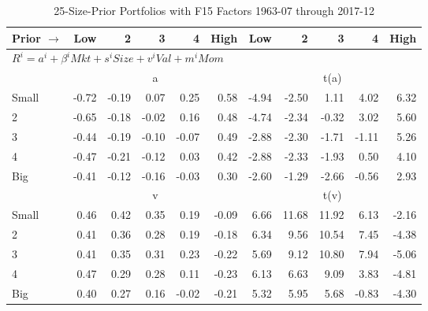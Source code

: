 
\begin{table}[!ht]
\footnotesize
\centering
\caption{25-Size-Prior Portfolios with F15 Factors 1963-07 through 2017-12}
\begin{tabular}{lrrrrrrrrrr}
  \toprule
    Prior $\rightarrow$ & Low & 2 & 3 & 4 & High & Low & 2 & 3 & 4 & High \\ 
  \midrule
  \multicolumn{11}{l}{$R^i=a^i+\beta^iMkt+s^iSize+v^iVal+m^iMom$} \\

  
    
      & \multicolumn{5}{c}{a} & \multicolumn{5}{c}{t(a)}
    
    \\
      \cmidrule(r){2-6} \cmidrule(r){7-11}

    Small   & -0.72  & -0.19  & 0.07  & 0.25  & 0.58  & -4.94  & -2.50  & 1.11  & 4.02  & 6.32  \\
         2  & -0.65  & -0.18  & -0.02  & 0.16  & 0.48  & -4.74  & -2.34  & -0.32  & 3.02  & 5.60  \\
         3  & -0.44  & -0.19  & -0.10  & -0.07  & 0.49  & -2.88  & -2.30  & -1.71  & -1.11  & 5.26  \\
         4  & -0.47  & -0.21  & -0.12  & 0.03  & 0.42  & -2.88  & -2.33  & -1.93  & 0.50  & 4.10  \\
    Big     & -0.41  & -0.12  & -0.16  & -0.03  & 0.30  & -2.60  & -1.29  & -2.66  & -0.56  & 2.93  \\

  
    
      & \multicolumn{5}{c}{v} & \multicolumn{5}{c}{t(v)}
    
    \\
      \cmidrule(r){2-6} \cmidrule(r){7-11}

    Small   & 0.46  & 0.42  & 0.35  & 0.19  & -0.09  & 6.66  & 11.68  & 11.92  & 6.13  & -2.16  \\
         2  & 0.41  & 0.36  & 0.28  & 0.19  & -0.18  & 6.34  & 9.56  & 10.54  & 7.45  & -4.38  \\
         3  & 0.41  & 0.35  & 0.31  & 0.23  & -0.22  & 5.69  & 9.12  & 10.80  & 7.94  & -5.06  \\
         4  & 0.47  & 0.29  & 0.28  & 0.11  & -0.23  & 6.13  & 6.63  & 9.09  & 3.83  & -4.81  \\
    Big     & 0.40  & 0.27  & 0.16  & -0.02  & -0.21  & 5.32  & 5.95  & 5.68  & -0.83  & -4.30  \\

  
    

\end{tabular}
\end{table}
